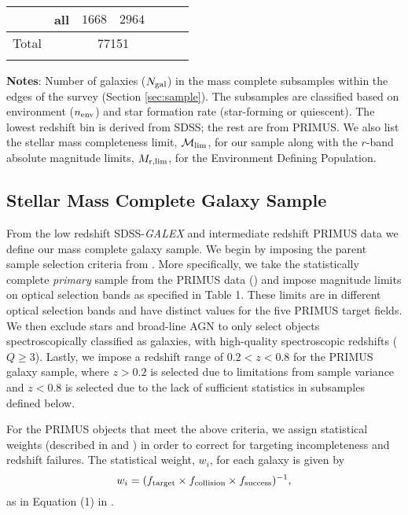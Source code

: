 \documentclass{emulateapj}
\begin{document}
\begin{table*}
\begin{center}
\begin{tabular}{ccccccc}
               & all              & $1668$                      & $2964$                          \\ \hline
Total &      & \multicolumn{2}{c}{77151} & \\ \hline
  \multicolumn{4}{l}{}                                             \\       
    \end{tabular} \par
    \end{center}
    {\bf Notes}: Number of galaxies ($N_{\rm{gal}}$) in the mass complete subsamples within the edges of the survey (Section \ref{sec:sample}). The subsamples are classified based on environment ($n_{\rm{env}}$) and star formation rate (star-forming or quiescent). The lowest redshift bin is derived from SDSS; the rest are from PRIMUS. We also list the stellar mass completeness limit, $\mathcal{M}_{\rm{lim}}$, for our sample along with the $r$-band absolute magnitude limits, $M_{\rm{r}, lim}$, for the Environment Defining Population. 
    \bigskip
\end{table*}

\subsection{Stellar Mass Complete Galaxy Sample} \label{sec:target} 
From the low redshift SDSS-{\em GALEX} and intermediate redshift
PRIMUS data we define our mass complete galaxy
sample. We begin by imposing the parent sample selection criteria from
\cite{Moustakas:2013aa}. More specifically, we take the statistically
complete {\em primary} sample from the PRIMUS data
(\citealt{Coil:2011aa}) and impose magnitude limits on optical
selection bands as specified in \cite{Moustakas:2013aa} Table 1. These
limits are in different optical selection bands and have distinct
values for the five PRIMUS target fields. We then exclude stars and
broad-line AGN to only select objects spectroscopically classified as
galaxies, with high-quality spectroscopic redshifts ($Q \geq
3$). Lastly, we impose a redshift range of $ 0.2 < z < 0.8$ for the
PRIMUS galaxy sample, where $ z > 0.2$ is selected due to limitations
from sample variance and $ z < 0.8$ is selected due to the lack of
sufficient statistics in subsamples defined below.

For the PRIMUS objects that meet the above criteria, we assign statistical weights (described in \citealt{Coil:2011aa} and \citealt{Cool:2013aa}) in order to correct for targeting incompleteness and redshift failures. The statistical weight, $w_i$, for each galaxy is given by
\begin{equation}
w_{i} = (f_{\rm{target}} \times f_{\rm{collision}} \times f_{\rm{success}})^{-1},
\end{equation}
as in Equation (1) in \cite{Moustakas:2013aa}. 
\end{document}
